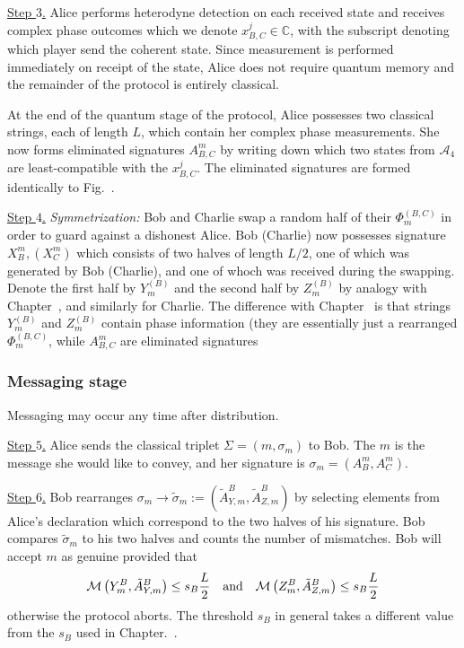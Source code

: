 \noindent \underline{Step $3$.} Alice performs heterodyne detection on each received state and receives complex phase outcomes which we denote $x_{B, C}^j \in \mathbb{C}$, with the subscript denoting which player send the coherent state. Since measurement is performed immediately on receipt of the state, Alice does not require quantum memory and the remainder of the protocol is entirely classical.

At the end of the quantum stage of the protocol, Alice possesses two classical strings, each of length $L$, which contain her complex phase measurements. She now forms eliminated signatures $A_{B, C}^m$ by writing down which two states from $\mathcal{A}_4$ are least-compatible with the $x_{B, C}^j$. The eliminated signatures are formed identically to Fig.~.

\noindent \underline{Step $4$.} \emph{Symmetrization:} Bob and Charlie swap a random half of their $\Phi_m^{\left(B, C\right)}$ in order to guard against a dishonest Alice. Bob (Charlie) now possesses signature $X_B^m, \left(X_C^m\right)$ which consists of two halves of length $L/2$, one of which was generated by Bob (Charlie), and one of whoch was received during the swapping. Denote the first half by $Y_m^{\left(B\right)}$ and the second half by $Z_m^{\left(B\right)}$ by analogy with Chapter~, and similarly for Charlie. The difference with Chapter~ is that strings$Y_m^{\left(B\right)}$ and $Z_m^{\left(B\right)}$ contain phase information (they are essentially just a rearranged $\Phi_m^{\left(B, C\right)}$, while $A_{B, C}^m$ are eliminated signatures

\subsubsection{Messaging stage}
Messaging may occur any time after distribution.

\noindent \underline{Step $5$.} Alice sends the classical triplet $\Sigma = \left(m, \sigma_m\right)$ to Bob. The $m$ is the message she would like to convey, and her signature is $\sigma_m = \left(A_B^m, A_C^m\right)$. 

\noindent \underline{Step $6$.} Bob rearranges $\sigma_m \rightarrow \tilde{\sigma}_m := \left(\tilde{A}_{Y, m}^B, \tilde{A}_{Z, m}^B\right)$ by selecting elements from Alice's declaration which correspond to the two halves of his signature. Bob compares $\tilde{\sigma}_m$ to his two halves and counts the number of mismatches. Bob will accept $m$ as genuine provided that
\begin{equation}
\mathcal{M}\left(Y_m^B, \tilde{A}_{Y, m}^B\right) \le s_B \frac{L}{2} \qq{and} \mathcal{M}\left(Z_m^B, \tilde{A}_{Z, m}^B\right) \le s_B \frac{L}{2}
\end{equation}
otherwise the protocol aborts. The threshold $s_B$ in general takes a different value from the $s_B$ used in Chapter.~.

